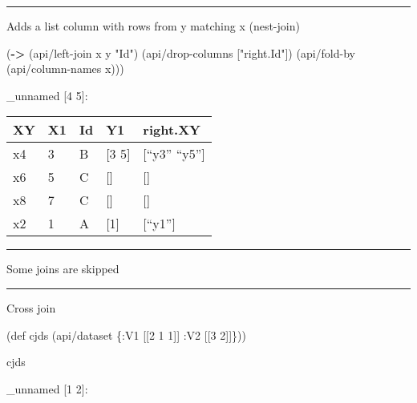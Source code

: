 \documentclass[]{article}
\newenvironment{Shaded}{\begin{snugshade}}{\end{snugshade}}
\newcommand{\KeywordTok}[1]{\textcolor[rgb]{0.13,0.29,0.53}{\textbf{#1}}}
\newcommand{\DecValTok}[1]{\textcolor[rgb]{0.00,0.00,0.81}{#1}}
\newcommand{\StringTok}[1]{\textcolor[rgb]{0.31,0.60,0.02}{#1}}
\newcommand{\FunctionTok}[1]{\textcolor[rgb]{0.00,0.00,0.00}{#1}}
\newcommand{\BuiltInTok}[1]{#1}
\newcommand{\AttributeTok}[1]{\textcolor[rgb]{0.77,0.63,0.00}{#1}}
\newcommand{\NormalTok}[1]{#1}
\begin{document}
\begin{center}\rule{0.5\linewidth}{0.5pt}\end{center}

Adds a list column with rows from y matching x (nest-join)

\begin{Shaded}
\begin{Highlighting}[]
\NormalTok{(}\KeywordTok{->}\NormalTok{ (api/left-join x y }\StringTok{"Id"}\NormalTok{)}
\NormalTok{    (api/drop-columns [}\StringTok{"right.Id"}\NormalTok{])}
\NormalTok{    (api/fold-by (api/column-names x)))}
\end{Highlighting}
\end{Shaded}

\_unnamed {[}4 5{]}:

\begin{longtable}[]{@{}lllll@{}}
\toprule
XY & X1 & Id & Y1 & right.XY\tabularnewline
\midrule
\endhead
x4 & 3 & B & {[}3 5{]} & {[}``y3'' ``y5''{]}\tabularnewline
x6 & 5 & C & {[}{]} & {[}{]}\tabularnewline
x8 & 7 & C & {[}{]} & {[}{]}\tabularnewline
x2 & 1 & A & {[}1{]} & {[}``y1''{]}\tabularnewline
\bottomrule
\end{longtable}

\begin{center}\rule{0.5\linewidth}{0.5pt}\end{center}

Some joins are skipped

\begin{center}\rule{0.5\linewidth}{0.5pt}\end{center}

Cross join

\begin{Shaded}
\begin{Highlighting}[]
\NormalTok{(}\BuiltInTok{def}\FunctionTok{ cjds }\NormalTok{(api/dataset \{}\AttributeTok{:V1}\NormalTok{ [[}\DecValTok{2} \DecValTok{1} \DecValTok{1}\NormalTok{]]}
                        \AttributeTok{:V2}\NormalTok{ [[}\DecValTok{3} \DecValTok{2}\NormalTok{]]\}))}
\end{Highlighting}
\end{Shaded}

\begin{Shaded}
\begin{Highlighting}[]
\NormalTok{cjds}
\end{Highlighting}
\end{Shaded}

\_unnamed {[}1 2{]}:
\end{document}

